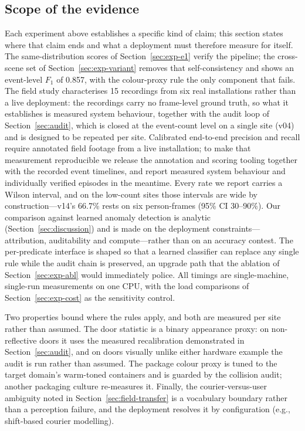 \documentclass[journal,article,submit,oneauthor]{Definitions/mdpi}
\begin{document}
\subsection{Scope of the evidence}
Each experiment above establishes a specific kind of claim; this section states where that
claim ends and what a deployment must therefore measure for itself. The same-distribution
scores of Section~\ref{sec:exp-e1} verify the pipeline; the cross-scene set of
Section~\ref{sec:exp-variant} removes that self-consistency and shows an event-level
$F_1$ of 0.857, with the colour-proxy rule the only component that fails. The field study
characterises 15 recordings from six real installations rather than a live deployment: the
recordings carry no frame-level ground truth, so what it establishes is measured system
behaviour, together with the audit loop of Section~\ref{sec:audit}, which is closed at the
event-count level on a single site (v04) and is designed to be repeated per site.
Calibrated end-to-end precision and recall require annotated field footage from a live
installation; to make that measurement reproducible we release the annotation and scoring
tooling together with the recorded event timelines, and report measured system behaviour
and individually verified episodes in the meantime. Every rate we report carries a Wilson
interval, and on the low-count sites those intervals are wide by construction---v14's
66.7\% rests on six person-frames (95\% CI 30--90\%). Our comparison against learned
anomaly detection is analytic (Section~\ref{sec:discussion}) and is made on the deployment
constraints---attribution, auditability and compute---rather than on an accuracy contest.
The per-predicate interface is shaped so that a learned classifier can replace any single
rule while the audit chain is preserved, an upgrade path that the ablation of
Section~\ref{sec:exp-abl} would immediately police. All timings are
single-machine, single-run measurements on one CPU, with the load comparisons of
Section~\ref{sec:exp-cost} as the sensitivity control.

Two properties bound where the rules apply, and both are measured per site rather than
assumed. The door statistic is a binary appearance proxy: on non-reflective doors it uses
the measured recalibration demonstrated in Section~\ref{sec:audit}, and on doors visually
unlike either hardware example the audit is run rather than assumed. The package colour
proxy is tuned to the target domain's warm-toned containers and is guarded by the collision
audit; another packaging culture re-measures it. Finally, the courier-versus-user ambiguity
noted in Section~\ref{sec:field-transfer} is a vocabulary boundary rather than a perception
failure, and the deployment resolves it by configuration (e.g., shift-based courier
modelling).
\end{document}

